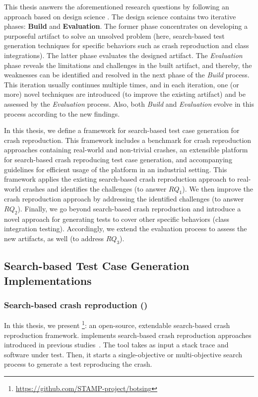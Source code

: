 This thesis answers the aforementioned research questions by following an approach based on design science \cite{Hevner2004}.
The design science contains two iterative phases: \textbf{Build} and \textbf{Evaluation}. The former phase concentrates on developing a purposeful artifact to solve an unsolved problem (here, search-based test generation techniques for specific behaviors such as crash reproduction and class integrations). The latter phase evaluates the designed artifact.
The \textit{Evaluation} phase reveals the limitations and challenges in the built artifact, and thereby, the weaknesses can be identified and resolved in the next phase of the \textit{Build} process. This iteration usually continues multiple times, and in each iteration, one (or more) novel techniques are introduced (to improve the existing artifact) and be assessed by the \textit{Evaluation} process. Also, both \textit{Build} and \textit{Evaluation} evolve in this process according to the new findings. 

In this thesis, we define a framework for search-based test case generation for crash reproduction. This framework includes a benchmark for crash reproduction approaches containing real-world and non-trivial crashes, an extensible platform for search-based crash reproducing test case generation, and accompanying guidelines for efficient usage of the platform in an industrial setting. This framework applies the existing search-based crash reproduction approach to real-world crashes and identifies the challenges (to answer $RQ_1$). We then improve the crash reproduction approach by addressing the identified challenges (to answer $RQ_2$). Finally, we go beyond search-based crash reproduction and introduce a novel approach for generating tests to cover other specific behaviors (\eg class integration testing). Accordingly, we extend the evaluation process to assess the new artifacts, as well (to address $RQ_3$).

\subsection{Search-based Test Case Generation Implementations}
\subsubsection{Search-based crash reproduction (\botsing)}
In this thesis, we present \botsing\footnote{\url{https://github.com/STAMP-project/botsing}}: an open-source, extendable search-based crash reproduction framework. \botsing implements search-based crash reproduction approaches introduced in previous studies~\cite{Rossler2013, Soltani2018a, Soltani2018b}. The tool takes as input a stack trace and software under test. Then, it starts a single-objective or multi-objective search process to generate a test reproducing the crash.

